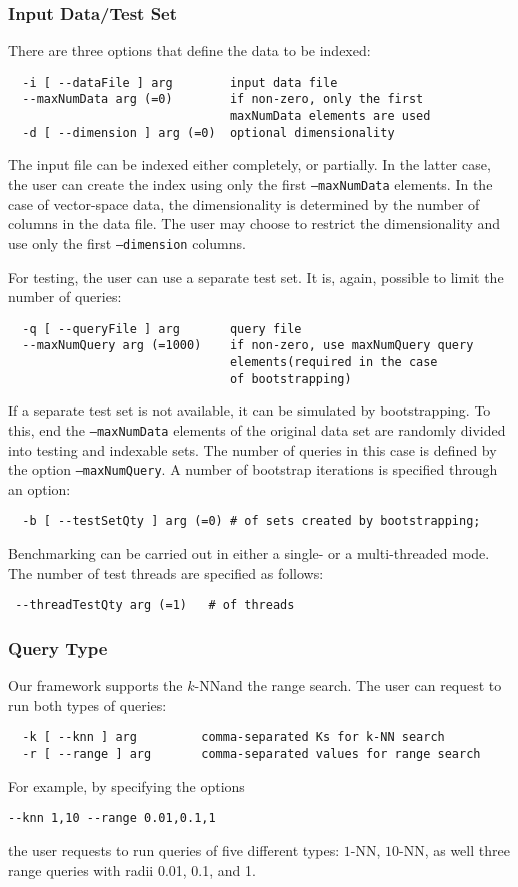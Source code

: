 \documentclass[runningheads,a4paper]{llncs}
\newcommand{\ttt}[1]{\texttt{#1}}
\newcommand{\knn}{$k$-NN}
\begin{document}
{\subsubsection{Input Data/Test Set}
There are three options that define the data to be indexed:
\begin{verbatim}
  -i [ --dataFile ] arg        input data file
  --maxNumData arg (=0)        if non-zero, only the first 
                               maxNumData elements are used
  -d [ --dimension ] arg (=0)  optional dimensionality
\end{verbatim}
The input file can be indexed either completely, or partially.
In the latter case, the user can create the index using only
the first \ttt{--maxNumData} elements.
In the case of vector-space data, the dimensionality is determined
by the number of columns in the data file.
The user may choose to restrict the dimensionality and use only the first 
\ttt{--dimension} columns.

For testing, the user can use a separate test set.
It is, again, possible to limit the number of queries:
\begin{verbatim}
  -q [ --queryFile ] arg       query file
  --maxNumQuery arg (=1000)    if non-zero, use maxNumQuery query 
                               elements(required in the case 
                               of bootstrapping)
\end{verbatim}
If a separate test set is not available, it can be simulated by bootstrapping.
To this, end the \ttt{--maxNumData} elements of the original data set
are randomly divided into testing and indexable sets.
The number of queries in this case is defined by the option \ttt{--maxNumQuery}.
A number of bootstrap iterations is specified through an option:
\begin{verbatim}
  -b [ --testSetQty ] arg (=0) # of sets created by bootstrapping; 
\end{verbatim}
Benchmarking can be carried out in either a single- or a multi-threaded
mode. The number of test threads are specified as follows:
\begin{verbatim}
 --threadTestQty arg (=1)   # of threads
\end{verbatim}

\subsubsection{Query Type} 
Our framework supports the \knn and the range search.
The user can request to run both types of queries:
\begin{verbatim}
  -k [ --knn ] arg         comma-separated Ks for k-NN search
  -r [ --range ] arg       comma-separated values for range search
\end{verbatim}
For example, by specifying the options 
\begin{verbatim}
--knn 1,10 --range 0.01,0.1,1
\end{verbatim}
the user requests to run queries of five different types: $1$-NN, $10$-NN,
as well three range queries with radii 0.01, 0.1, and 1.

}
\end{document}
